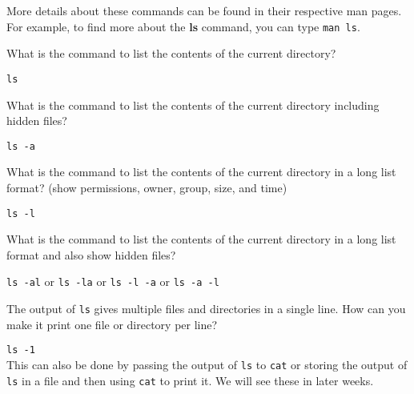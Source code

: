 More details about these commands can be found in their respective
man pages. For example, to find more about the \textbf{ls} command,
you can type \lstinline|man ls|.

\begin{qs}
  What is the command to list the contents of the current directory?
\end{qs}

\begin{ans}
  \lstinline|ls|
\end{ans}


\begin{qs}
  What is the command to list the contents of the current directory
  including hidden files?
\end{qs}

\begin{ans}
\lstinline|ls -a|
\end{ans}

\begin{qs}
  What is the command to list the contents of the current directory
  in a long list format? (show permissions, owner, group, size, and time)
\end{qs}

\begin{ans}
\lstinline|ls -l|
\end{ans}

\begin{qs}
  What is the command to list the contents of the current directory
  in a long list format and also show hidden files?
\end{qs}

\begin{ans}
\lstinline|ls -al| or \lstinline|ls -la| or \lstinline|ls -l -a| or \lstinline|ls -a -l|
\end{ans}

\begin{qs}
  The output of \lstinline|ls| gives multiple files and directories in a single
  line. How can you make it print one file or directory per line?
\end{qs}

\begin{ans}
  \lstinline|ls -1|\\
  This can also be done by passing the output of \lstinline|ls| to \lstinline|cat|
  or storing the output of \lstinline|ls| in a file and then using \lstinline|cat|
  to print it. We will see these in later weeks.
\end{ans}

